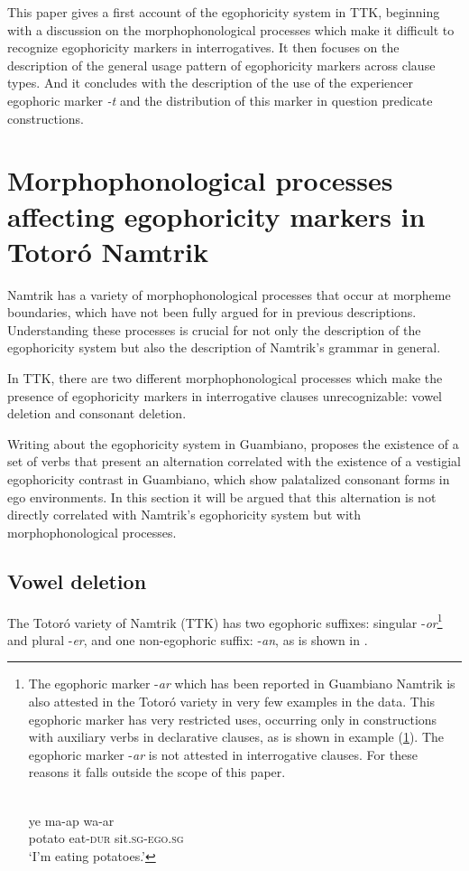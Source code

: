\documentclass[output=paper]{langsci/langscibook}
\begin{document}
This paper gives a first account of the egophoricity system in TTK, beginning with a discussion on the morphophonological processes which make it difficult to recognize egophoricity markers in interrogatives. It then focuses on the description of the general usage pattern of egophoricity markers across clause types. And it concludes with the description of the use of the experiencer egophoric marker \textit{-t} and the distribution of this marker in question predicate constructions.
  

\section{Morphophonological processes affecting egophoricity markers in Totoró Namtrik}\label{s:gg1}

Namtrik has a variety of morphophonological processes that occur at morpheme boundaries, which have not been fully argued for in previous descriptions. Understanding these processes is crucial for not only the description of the egophoricity system but also the description of Namtrik’s grammar in general. 

In TTK, there are two different morphophonological processes which make the presence of egophoricity markers in interrogative clauses unrecognizable: vowel deletion and consonant deletion.

Writing about the egophoricity system in Guambiano, \citet{Norcliffe2018} proposes the existence of a set of verbs that present an alternation correlated with the existence of a vestigial egophoricity contrast in Guambiano, which show palatalized consonant forms in ego environments. In this section it will be argued that this alternation is not directly correlated with Namtrik’s egophoricity system but with morphophonological processes. 


\subsection{Vowel deletion}\label{s:gg1-1}

The Totoró variety of Namtrik (TTK) has two egophoric suffixes: singular -\textit{or}\footnote{
	The egophoric marker -\textit{ar} which has been reported in Guambiano Namtrik is also attested in the Totoró variety in very few examples in the data. This egophoric marker has very restricted uses, occurring only in constructions with auxiliary verbs in declarative clauses, as is shown in example (\ref{ex:gg-FN}). The egophoric marker -\textit{ar} is not attested in interrogative clauses. For these reasons it falls outside the scope of this paper.
	
	\ea\label{ex:gg-FN}
    \\
	\gll  ye	 ma-ap wa-ar \\
      potato eat-\textsc{dur} sit.\textsc{sg-ego.sg}\\
	\glt ‘I’m eating potatoes.’
	\z} and plural -\textit{er}, and one non-egophoric suffix: -\textit{an}, as is shown in .
	
\end{document}
